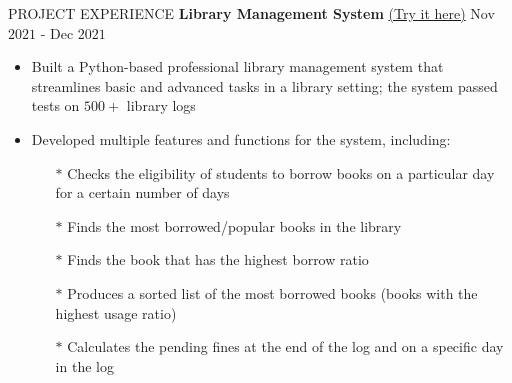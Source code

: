 \documentclass{resume} %
\begin{document}
\begin{rSection}{PROJECT EXPERIENCE}
\textbf{Library Management System }{\href{https://github.com/harshitjain17/Library-Management-System}{(Try it here)}} \hfill Nov $2021$ - Dec $2021$
\begin{itemize}
    \itemsep -3pt {}
    \item Built a Python-based professional library management system that streamlines basic and advanced tasks in a library setting; the system passed tests on $500+$ library logs
    \item Developed multiple features and functions for the system, including:
    \begin{itemize}
        \itemsep -3pt {}
        \item[$*$] Checks the eligibility of students to borrow books on a particular day for a certain number of days
        \item[$*$] Finds the most borrowed/popular books in the library
        \item[$*$] Finds the book that has the highest borrow ratio
        \item[$*$] Produces a sorted list of the most borrowed books (books with the highest usage ratio)
        \item[$*$] Calculates the pending fines at the end of the log and on a specific day in the log
    \end{itemize}
\end{itemize}

\end{rSection} 



\end{document}

